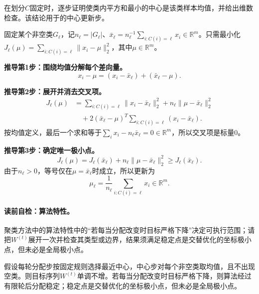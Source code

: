 \label{struct:V4-C02-CH11}
\begin{derivationgoalbox}
在划分$C$固定时，逐步证明使类内平方和最小的中心是该类样本均值，并给出维数检查。该结论用于\kMeans{}的中心更新步。
\end{derivationgoalbox}
\begin{derivationprepbox}
固定某个非空类$G_\ell$，记$n_\ell=|G_\ell|$、$\bar x_\ell=n_\ell^{-1}\sum_{i:C(i)=\ell}x_i\in\mathbb R^m$。只需最小化$J_\ell(\mu)=\sum_{i:C(i)=\ell}\|x_i-\mu\|_2^2$，其中$\mu\in\mathbb R^m$。
\end{derivationprepbox}

\textbf{推导第1步：围绕均值分解每个差向量。}
\[
x_i-\mu=(x_i-\bar x_\ell)+(\bar x_\ell-\mu).
\]

\textbf{推导第2步：展开并消去交叉项。}
\[
\begin{aligned}
J_\ell(\mu)
&=\sum_{i:C(i)=\ell}\|x_i-\bar x_\ell\|_2^2
+n_\ell\|\mu-\bar x_\ell\|_2^2\\
&\quad+2(\bar x_\ell-\mu)^T\sum_{i:C(i)=\ell}(x_i-\bar x_\ell).
\end{aligned}
\]
按均值定义，最后一个求和等于$\sum_i x_i-n_\ell\bar x_\ell=0\in\mathbb R^m$，所以交叉项是标量0。

\textbf{推导第3步：确定唯一极小点。}
\[
J_\ell(\mu)=J_\ell(\bar x_\ell)+n_\ell\|\mu-\bar x_\ell\|_2^2
\geq J_\ell(\bar x_\ell).
\]
由于$n_\ell>0$，等号仅在$\mu=\bar x_\ell$时成立，所以更新为
\[
\mu_\ell=\frac1{n_\ell}\sum_{i:C(i)=\ell}x_i\in\mathbb R^m.
\]

\paragraph{读前自检：算法特性。}聚类方法中的算法特性中的“若每当分配改变时目标严格下降”决定可执行范围；请把$W^{(t)}$展开一次并检查其类型或边界，结果须满足稳定点是交替优化的坐标极小点，但未必是全局极小点。\par

\label{struct:V4-C02-CH12}
\begin{theorem}\label{thm:V4-C02-kmeans-descent}
假设每轮分配步按固定规则选择最近中心，中心步对每个非空类取均值，且不出现空类。则目标序列$W^{(t)}$单调不增。若每当分配改变时目标严格下降，则算法经过有限轮后分配稳定；稳定点是交替优化的坐标极小点，但未必是全局极小点。
\end{theorem}

